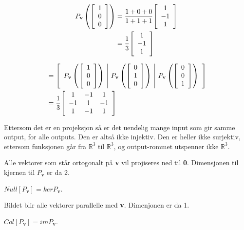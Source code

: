 \documentclass[11pt, a4paper, norsk]{NTNUoving}
\newenvironment{pkt}{\begin{punkt}}{\end{punkt}}
\newenvironment{matrise}[1][c]{
        \left[
            \begin{array}{#1}
    }
    {    
    \end{array}
    \right]           
}
\newcommand{\R}{\mathbb{R}}
\begin{document}
\begin{oppgave}
\begin{pkt}
    \begin{align*}
        P_\textbf{v}\left( \begin{matrise}
        1\\0\\0
        \end{matrise}\right)&=\frac{1+0+0}{1+1+1}\begin{matrise}
        1\\-1\\1
        \end{matrise}
        \\&= \frac{1}{3}\begin{matrise}
        1\\-1\\1
        \end{matrise}
    \end{align*}
\end{pkt}
\begin{pkt}
    \begin{align*}
        [P_\textbf{v}]&=\begin{matrise}[c|c|c]
        P_\textbf{v}\left( \begin{matrise}
        1\\0\\0
        \end{matrise}\right) & P_\textbf{v}\left( \begin{matrise}
        0\\1\\0
        \end{matrise}\right) & P_\textbf{v}\left( \begin{matrise}
        0\\0\\1
        \end{matrise}\right)
        \end{matrise}
        \\&=\frac{1}{3}\begin{matrise}[ccc]
        1 & -1&1\\-1&1&-1\\1&-1&1
        \end{matrise}
    \end{align*}
\end{pkt}
\begin{pkt}
    Ettersom det er en projeksjon så er det uendelig mange input som gir samme output, for alle outputs. Den er altså ikke injektiv. Den er heller ikke surjektiv, ettersom funksjonen går fra $\R^3$ til $\R^3$, og output-rommet utspenner ikke $\R^3$.
\end{pkt}
\begin{pkt}
    Alle vektorer som står ortogonalt på \textbf{v} vil projiseres ned til \textbf{0}. Dimensjonen til kjernen til $P_\textbf{v}$ er da 2.
    
    $Null[P_\textbf{v}]=kerP_\textbf{v}$.
    
    Bildet blir alle vektorer parallelle med \textbf{v}. Dimenjonen er da 1.
    
    $Col[P_\textbf{v}]=imP_\textbf{v}$.
\end{pkt}
\end{oppgave}
\end{document}
